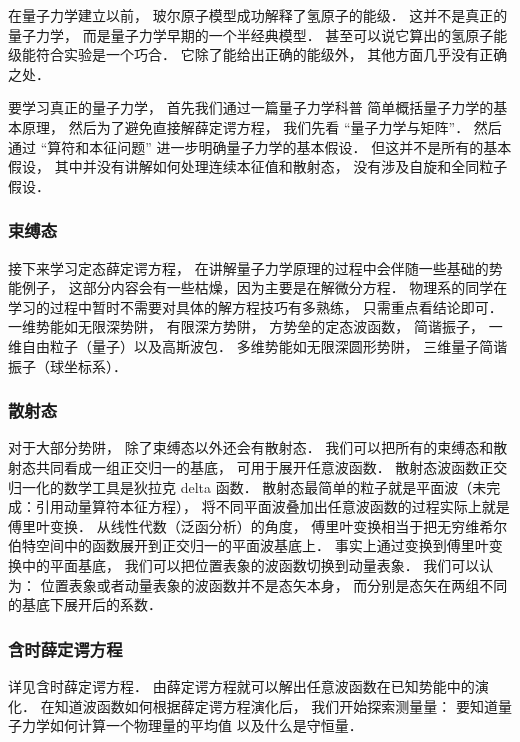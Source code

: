 在量子力学建立以前， 玻尔原子模型成功解释了氢原子的能级． 这并不是真正的量子力学， 而是量子力学早期的一个半经典模型． 甚至可以说它算出的氢原子能级能符合实验是一个巧合． 它除了能给出正确的能级外， 其他方面几乎没有正确之处．

要学习真正的量子力学， 首先我们通过一篇量子力学科普 简单概括量子力学的基本原理， 然后为了避免直接解薛定谔方程， 我们先看 “量子力学与矩阵”． 然后通过 “算符和本征问题” 进一步明确量子力学的基本假设． 但这并不是所有的基本假设， 其中并没有讲解如何处理连续本征值和散射态， 没有涉及自旋和全同粒子假设．

\subsubsection{束缚态}
接下来学习定态薛定谔方程， 在讲解量子力学原理的过程中会伴随一些基础的势能例子， 这部分内容会有一些枯燥，因为主要是在解微分方程． 物理系的同学在学习的过程中暂时不需要对具体的解方程技巧有多熟练， 只需重点看结论即可． 一维势能如无限深势阱， 有限深方势阱， 方势垒的定态波函数， 简谐振子， 一维自由粒子（量子）以及高斯波包． 多维势能如无限深圆形势阱， 三维量子简谐振子（球坐标系）．

\subsubsection{散射态}
对于大部分势阱， 除了束缚态以外还会有散射态． 我们可以把所有的束缚态和散射态共同看成一组正交归一的基底， 可用于展开任意波函数． 散射态波函数正交归一化的数学工具是狄拉克 delta 函数． 散射态最简单的粒子就是平面波（未完成：引用动量算符本征方程）， 将不同平面波叠加出任意波函数的过程实际上就是傅里叶变换． 从线性代数（泛函分析）的角度， 傅里叶变换相当于把无穷维希尔伯特空间中的函数展开到正交归一的平面波基底上． 事实上通过变换到傅里叶变换中的平面基底， 我们可以把位置表象的波函数切换到动量表象． 我们可以认为： 位置表象或者动量表象的波函数并不是态矢本身， 而分别是态矢在两组不同的基底下展开后的系数．

\subsubsection{含时薛定谔方程}
详见含时薛定谔方程． 由薛定谔方程就可以解出任意波函数在已知势能中的演化． 在知道波函数如何根据薛定谔方程演化后， 我们开始探索测量量： 要知道量子力学如何计算一个物理量的平均值 以及什么是守恒量．

